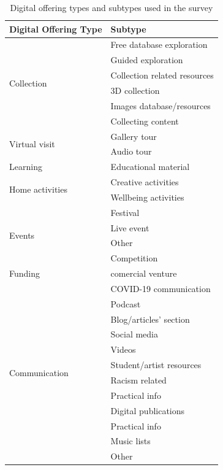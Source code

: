 \documentclass{egpubl}
\begin{document}
\begin{table}
\small                    %
\setlength\tabcolsep{4pt} %
\centering

\begin{tabular}{
	| l | l |}


    \hline
    \textbf{Digital Offering Type}  & \textbf{Subtype}  \\
    \hline
  \multirow{6}{*}{Collection} & Free database exploration  \\
&  Guided exploration  \\
&  Collection related resources \\
&  3D collection \\
&  Images database/resources \\
&  Collecting content \\
    \hline
 \multirow{2}{*}{Virtual visit} & Gallery tour  \\
&  Audio tour  \\
    \hline
 Learning & Educational material  \\
    \hline
 \multirow{2}{*}{Home activities} & Creative activities \\
&  Wellbeing activities  \\
    \hline
 \multirow{4}{*}{Events} & Festival\\
&  Live event \\
&  Other \\
&  Competition \\
    \hline
 Funding & comercial venture \\
    \hline
 \multirow{12}{*}{Communication} & COVID-19 communication \\
& Podcast \\
& Blog/articles' section \\
& Social media  \\
& Videos \\
& Student/artist resources \\
& Racism related \\
& Practical info \\
& Digital publications \\
& Practical info \\
& Music lists \\
& Other \\
    \hline
\end{tabular}
\caption{\label{tab:digoffer}Digital offering types and subtypes used in the survey}
\end{table}
\normalsize
\end{document}
